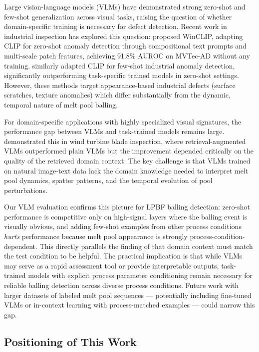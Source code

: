 Large vision-language models (VLMs) have demonstrated strong
zero-shot and few-shot generalization across visual tasks,
raising the question of whether domain-specific training is
necessary for defect detection. Recent work in industrial
inspection has explored this question: \citet{jeong2023winclip}
proposed WinCLIP, adapting CLIP for zero-shot anomaly detection
through compositional text prompts and multi-scale patch
features, achieving 91.8\% AUROC on MVTec-AD without any
training. \citet{li2024fade} similarly adapted CLIP for
few-shot industrial anomaly detection, significantly
outperforming task-specific trained models in zero-shot
settings. However, these methods target appearance-based
industrial defects (surface scratches, texture anomalies)
which differ substantially from the dynamic, temporal nature
of melt pool balling.

For domain-specific applications with highly specialized
visual signatures, the performance gap between VLMs and
task-trained models remains large. \citet{zhang2025seeing}
demonstrated this in wind turbine blade inspection, where
retrieval-augmented VLMs outperformed plain VLMs but the
improvement depended critically on the quality of the
retrieved domain context. The key challenge is that VLMs
trained on natural image-text data lack the domain knowledge
needed to interpret melt pool dynamics, spatter patterns,
and the temporal evolution of pool perturbations.

Our VLM evaluation confirms this picture for LPBF balling
detection: zero-shot performance is competitive only on
high-signal layers where the balling event is visually
obvious, and adding few-shot examples from other process
conditions \emph{hurts} performance because melt pool
appearance is strongly process-condition-dependent. This
directly parallels the finding of \citet{zhang2025seeing}
that domain context must match the test condition to be
helpful. The practical implication is that while VLMs may
serve as a rapid assessment tool or provide interpretable
outputs, task-trained models with explicit process parameter
conditioning remain necessary for reliable balling detection
across diverse process conditions. Future work with larger
datasets of labeled melt pool sequences — potentially
including fine-tuned VLMs or in-context learning with
process-matched examples — could narrow this gap.

\subsection{Positioning of This Work}

